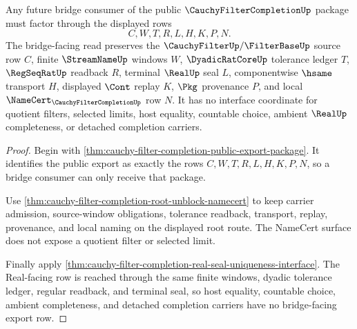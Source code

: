 \begin{theorem}
\label{thm:cauchy-filter-completion-bridge-facing-interface}
Any future bridge consumer of the public $\CauchyFilterCompletionUp$ package must factor through the displayed rows
$$
C,W,T,R,L,H,K,P,N .
$$
The bridge-facing read preserves the $\CauchyFilterUp/\FilterBaseUp$ source row $C$, finite $\StreamNameUp$ windows $W$, $\DyadicRatCoreUp$ tolerance ledger $T$, $\RegSeqRatUp$ readback $R$, terminal $\RealUp$ seal $L$, componentwise $\hsame$ transport $H$, displayed $\Cont$ replay $K$, $\Pkg$ provenance $P$, and local $\NameCert_{\CauchyFilterCompletionUp}$ row $N$. It has no interface coordinate for quotient filters, selected limits, host equality, countable choice, ambient $\RealUp$ completeness, or detached completion carriers.
\end{theorem}
\begin{proof}
Begin with \autoref{thm:cauchy-filter-completion-public-export-package}. It identifies the public export as exactly the rows $C,W,T,R,L,H,K,P,N$, so a bridge consumer can only receive that package.

Use \autoref{thm:cauchy-filter-completion-root-unblock-namecert} to keep carrier admission, source-window obligations, tolerance readback, transport, replay, provenance, and local naming on the displayed root route. The NameCert surface does not expose a quotient filter or selected limit.

Finally apply \autoref{thm:cauchy-filter-completion-real-seal-uniqueness-interface}. The Real-facing row is reached through the same finite windows, dyadic tolerance ledger, regular readback, and terminal seal, so host equality, countable choice, ambient completeness, and detached completion carriers have no bridge-facing export row.
\end{proof}

